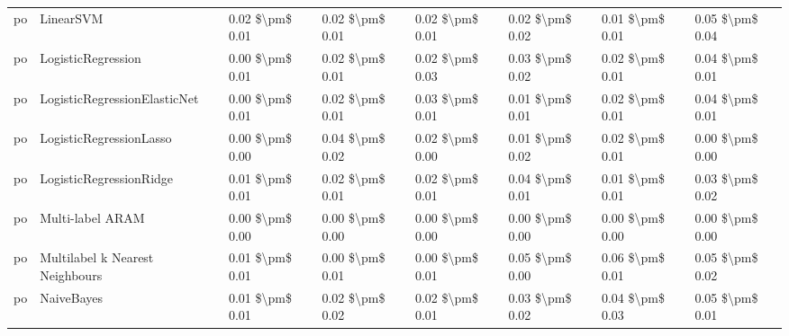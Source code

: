 \begin{tabular}{llllllll}
      po &                       LinearSVM & 0.02 \$\textbackslash pm\$ 0.01 &           0.02 \$\textbackslash pm\$ 0.01 &       0.02 \$\textbackslash pm\$ 0.01 &        0.02 \$\textbackslash pm\$ 0.02 &                         0.01 \$\textbackslash pm\$ 0.01 &     0.05 \$\textbackslash pm\$ 0.04 \\
      po &              LogisticRegression & 0.00 \$\textbackslash pm\$ 0.01 &           0.02 \$\textbackslash pm\$ 0.01 &       0.02 \$\textbackslash pm\$ 0.03 &        0.03 \$\textbackslash pm\$ 0.02 &                         0.02 \$\textbackslash pm\$ 0.01 &     0.04 \$\textbackslash pm\$ 0.01 \\
      po &    LogisticRegressionElasticNet & 0.00 \$\textbackslash pm\$ 0.01 &           0.02 \$\textbackslash pm\$ 0.01 &       0.03 \$\textbackslash pm\$ 0.01 &        0.01 \$\textbackslash pm\$ 0.01 &                         0.02 \$\textbackslash pm\$ 0.01 &     0.04 \$\textbackslash pm\$ 0.01 \\
      po &         LogisticRegressionLasso & 0.00 \$\textbackslash pm\$ 0.00 &           0.04 \$\textbackslash pm\$ 0.02 &       0.02 \$\textbackslash pm\$ 0.00 &        0.01 \$\textbackslash pm\$ 0.02 &                         0.02 \$\textbackslash pm\$ 0.01 &     0.00 \$\textbackslash pm\$ 0.00 \\
      po &         LogisticRegressionRidge & 0.01 \$\textbackslash pm\$ 0.01 &           0.02 \$\textbackslash pm\$ 0.01 &       0.02 \$\textbackslash pm\$ 0.01 &        0.04 \$\textbackslash pm\$ 0.01 &                         0.01 \$\textbackslash pm\$ 0.01 &     0.03 \$\textbackslash pm\$ 0.02 \\
      po &                Multi-label ARAM & 0.00 \$\textbackslash pm\$ 0.00 &           0.00 \$\textbackslash pm\$ 0.00 &       0.00 \$\textbackslash pm\$ 0.00 &        0.00 \$\textbackslash pm\$ 0.00 &                         0.00 \$\textbackslash pm\$ 0.00 &     0.00 \$\textbackslash pm\$ 0.00 \\
      po & Multilabel k Nearest Neighbours & 0.01 \$\textbackslash pm\$ 0.01 &           0.00 \$\textbackslash pm\$ 0.01 &       0.00 \$\textbackslash pm\$ 0.01 &        0.05 \$\textbackslash pm\$ 0.00 &                         0.06 \$\textbackslash pm\$ 0.01 &     0.05 \$\textbackslash pm\$ 0.02 \\
      po &                      NaiveBayes & 0.01 \$\textbackslash pm\$ 0.01 &           0.02 \$\textbackslash pm\$ 0.02 &       0.02 \$\textbackslash pm\$ 0.01 &        0.03 \$\textbackslash pm\$ 0.02 &                         0.04 \$\textbackslash pm\$ 0.03 &     0.05 \$\textbackslash pm\$ 0.01 \\

\end{tabular}
